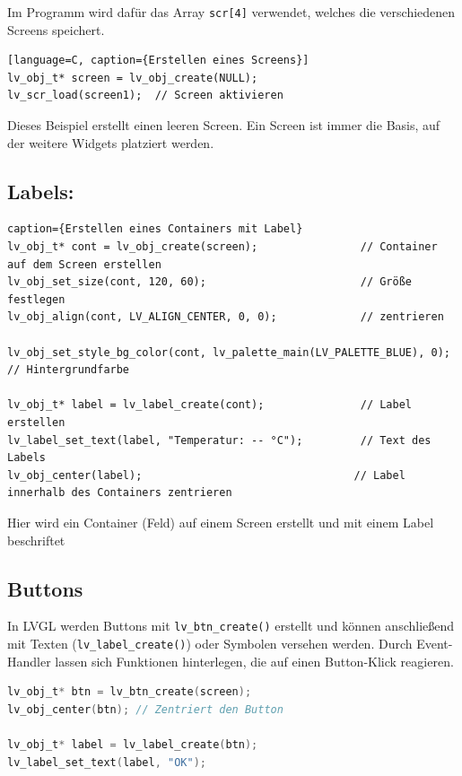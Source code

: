 \begin{inhalt}
Im Programm wird dafür das Array \texttt{scr[4]} verwendet, welches die verschiedenen Screens speichert.

\begin{lstlisting}[style=mytsx][language=C, caption={Erstellen eines Screens}]
lv_obj_t* screen = lv_obj_create(NULL);
lv_scr_load(screen1);  // Screen aktivieren
\end{lstlisting}

Dieses Beispiel erstellt einen leeren Screen. Ein Screen ist immer die Basis, auf der weitere Widgets platziert werden.


\subsection{Labels:}

\begin{lstlisting}[style=mytsx] caption={Erstellen eines Containers mit Label}
lv_obj_t* cont = lv_obj_create(screen);                // Container auf dem Screen erstellen
lv_obj_set_size(cont, 120, 60);                        // Größe festlegen
lv_obj_align(cont, LV_ALIGN_CENTER, 0, 0);             // zentrieren

lv_obj_set_style_bg_color(cont, lv_palette_main(LV_PALETTE_BLUE), 0); // Hintergrundfarbe

lv_obj_t* label = lv_label_create(cont);               // Label erstellen
lv_label_set_text(label, "Temperatur: -- °C");         // Text des Labels
lv_obj_center(label);                                 // Label innerhalb des Containers zentrieren
\end{lstlisting}

Hier wird ein Container (Feld) auf einem Screen erstellt und mit einem Label beschriftet

\subsection{Buttons}

In LVGL werden Buttons mit \texttt{lv\_btn\_create()} erstellt und können anschließend mit Texten (\texttt{lv\_label\_create()}) oder Symbolen versehen werden. Durch Event-Handler lassen sich Funktionen hinterlegen, die auf einen Button-Klick reagieren.

\begin{lstlisting}[language=C, caption={Erstellen eines Buttons mit Label}]
lv_obj_t* btn = lv_btn_create(screen);
lv_obj_center(btn); // Zentriert den Button

lv_obj_t* label = lv_label_create(btn);
lv_label_set_text(label, "OK");
\end{lstlisting}


\end{inhalt}
